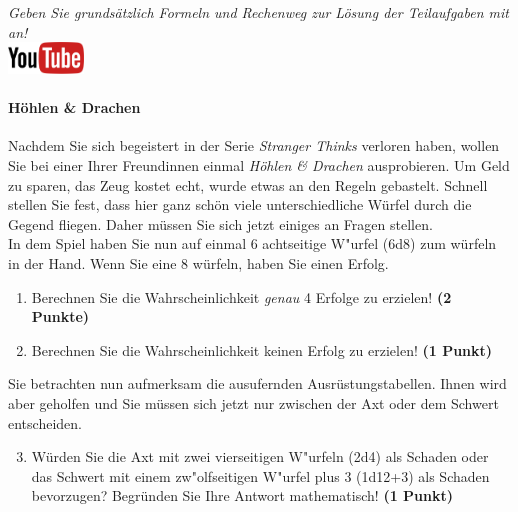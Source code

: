 \documentclass[a4paper, 9pt]{scrartcl}\usepackage[]{graphicx}\usepackage[]{xcolor}
\begin{document}
\textit{Geben Sie grunds{\"a}tzlich Formeln und Rechenweg zur L{\"o}sung der
  Teilaufgaben mit an!} \\[1Ex]

\hfill\href{https://youtu.be/8Pb2sKUIMyk}{\includegraphics[width =
  2cm]{img/youtube}} %
\hspace{2Ex}

\paragraph{H{\"o}hlen \& Drachen}



Nachdem Sie sich begeistert in der Serie \textit{Stranger Thinks} verloren
haben, wollen Sie bei einer Ihrer Freundinnen einmal \textit{H{\"o}hlen \& Drachen}
ausprobieren. Um Geld zu sparen, das Zeug kostet echt, wurde etwas an den
Regeln gebastelt. Schnell stellen Sie fest, dass hier ganz sch{\"o}n viele
unterschiedliche W{\"u}rfel durch die Gegend fliegen. Daher m{\"u}ssen Sie sich
jetzt einiges an Fragen stellen. \\%

In dem Spiel haben Sie nun auf einmal 6 achtseitige W{"u}rfel (6d8) zum w{\"u}rfeln in der Hand. Wenn Sie eine 8 w{\"u}rfeln,
haben Sie einen Erfolg.

\begin{enumerate}
\item Berechnen Sie die Wahrscheinlichkeit \textit{genau}
  4 Erfolge zu erzielen!  \textbf{(2 Punkte)}
\item Berechnen Sie die Wahrscheinlichkeit keinen Erfolg zu erzielen!
  \textbf{(1 Punkt)}
\end{enumerate}

Sie betrachten nun aufmerksam die ausufernden Ausr{\"u}stungstabellen. Ihnen
wird aber geholfen und Sie m{\"u}ssen sich jetzt nur zwischen der Axt oder dem
Schwert entscheiden.

\begin{enumerate}
  \setcounter{enumi}{2}
\item W{\"u}rden Sie die Axt mit zwei vierseitigen W{"u}rfeln (2d4) als Schaden oder
  das Schwert mit einem zw{"o}lfseitigen W{"u}rfel plus 3 (1d12+3) als Schaden bevorzugen?
  Begr{\"u}nden Sie Ihre Antwort mathematisch! \textbf{(1 Punkt)}
\end{enumerate}
\end{document}
